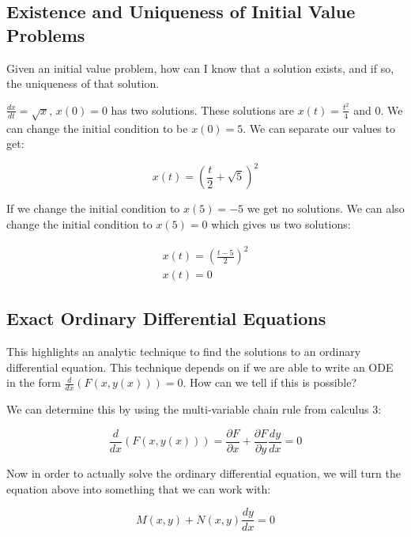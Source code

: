 \subsection{}

\subsection{Existence and Uniqueness of Initial Value Problems}

  Given an initial value problem, how can I know that a solution exists, and if so, the uniqueness of that solution.

  \begin{problem}
    $\frac{dx}{dt}=\sqrt{x}$, $x(0)=0$ has two solutions. These solutions are $x(t)=\frac{t^2}{4}$ and $0$. We can change the initial condition to be $x(0)=5$. We can separate our values to get:

    \[
      x(t) =\left(\frac{t}{2} + \sqrt{5}\right)^2
    \]
    
    If we change the initial condition to $x(5)=-5$ we get no solutions. We can also change the initial condition to $x(5)=0$ which gives us two solutions:

    \begin{align*}
      x(t) =\left(\frac{t - 5}{2}\right)^2\\
      x(t) = 0
    \end{align*}
  \end{problem}

\subsection{Exact Ordinary Differential Equations}

  This highlights an analytic technique to find the solutions to an ordinary differential equation. This technique depends on if we are able to write an ODE in the form $\frac{d}{dx}(F(x,y(x)))=0$. How can we tell if this is possible? 

    We can determine this by using the multi-variable chain rule from calculus 3:

    \[
      \frac{d}{dx}(F(x,y(x))) = \frac{\partial F}{\partial x} + \frac{\partial F}{\partial y} \frac{dy}{dx} = 0 
    \]

    Now in order to actually solve the ordinary differential equation, we will turn the equation above into something that we can work with:

    \[
      M(x,y) + N(x,y)\frac{dy}{dx} = 0
    \]

